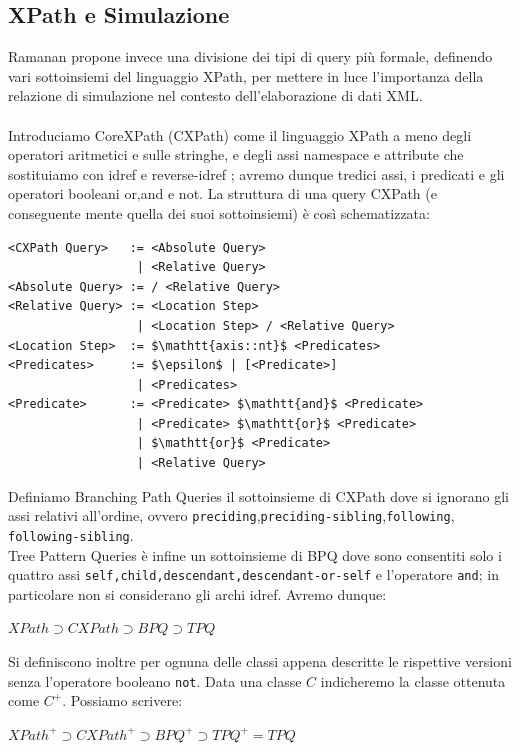 \subsection{XPath e Simulazione}
Ramanan propone invece una divisione dei tipi di query più formale, definendo vari sottoinsiemi del linguaggio XPath, per mettere in luce l'importanza della relazione di simulazione nel contesto dell'elaborazione di dati XML.\\\\
Introduciamo CoreXPath (CXPath) come il linguaggio XPath a meno degli operatori aritmetici e sulle stringhe, e degli assi namespace e attribute che sostituiamo con idref e reverse-idref ; avremo dunque tredici assi, i predicati e gli operatori booleani or,and e not. La struttura di una query CXPath (e conseguente mente quella dei suoi sottoinsiemi) è così schematizzata:
\begin{lstlisting}[mathescape, basicstyle=\small,title=\textbf{"Grammatica CXPath"}]
<CXPath Query>   := <Absolute Query>
                  | <Relative Query>
<Absolute Query> := / <Relative Query>
<Relative Query> := <Location Step>
                  | <Location Step> / <Relative Query>
<Location Step>  := $\mathtt{axis::nt}$ <Predicates>
<Predicates>     := $\epsilon$ | [<Predicate>] 
                  | <Predicates>
<Predicate>      := <Predicate> $\mathtt{and}$ <Predicate> 
                  | <Predicate> $\mathtt{or}$ <Predicate>
                  | $\mathtt{or}$ <Predicate>
                  | <Relative Query>
\end{lstlisting}
Definiamo Branching Path Queries il sottoinsieme di CXPath dove si ignorano gli assi relativi all'ordine, ovvero \texttt{preciding},\texttt{preciding-sibling},\texttt{following},\\ \texttt{following-sibling}.
\\Tree Pattern Queries è infine un sottoinsieme di BPQ dove sono consentiti solo i quattro assi \texttt{self,child,descendant,descendant-or-self} e l'operatore \texttt{and}; in particolare non si considerano gli archi idref. Avremo dunque:\\ \begin{center}
$XPath \supset CXPath \supset BPQ \supset TPQ$
\end{center}
Si definiscono inoltre per ognuna delle classi appena descritte le rispettive versioni senza l'operatore booleano \texttt{not}. Data una classe $C$ indicheremo la classe ottenuta come $C^+$. Possiamo scrivere:
\begin{center}
$XPath^+ \supset CXPath^+ \supset BPQ^+ \supset TPQ^+ = TPQ$
\end{center}
